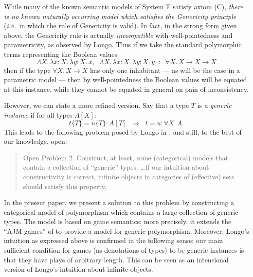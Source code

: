 \documentclass[a4paper,11pt]{article}
\newcommand{\ie}{\textit{i.e.}\ }
\begin{document}
While many of the known semantic models of System F satisfy axiom (C),
\emph{there is no known naturally occurring model which satisfies the
  Genericity principle} (\ie in which the  rule of
  Genericity is valid). In fact, in the strong form given above, the
  Genericity rule is actually \emph{incompatible} with
  well-pointedness and parametricity, as observed by Longo. Thus if we
  take the standard polymorphic terms representing the Boolean values
\[ \Lambda X.\, \lambda x{:}X.\, \lambda y{:}X.\, x , \;\; \Lambda X. \, \lambda
x{:}X. \, \lambda y{:}X.\, y \;\; : \;\; \forall X. \, X \rightarrow X \rightarrow X \]
then if the type $\forall X. \, X \rightarrow X$ has only one
inhabitant --- as will be the case in a parametric model --- then by
well-pointedness the Boolean values will be equated at this instance,
while they cannot be equated in general on pain of inconsistency.

However, we can state a more refined version. Say that a type $T$ is
\emph{a generic instance} if for all types $A[X]$:
\[ t\{ T\} = u\{T\} : A[T] \;\; \Longrightarrow \;\; t = u : \forall X. \, A
. \]
This leads to the following problem posed by Longo in  \cite{Lon95}, and
still, to the best of our knowledge, open:
\begin{quotation}
Open Problem 2. Construct, at least, some (categorical) models that
contain a collection of ``generic'' types. \ldots If our intuition
about constructivity is correct, infinite objects in categories of
(effective) sets should satisfy this property.
\end{quotation}

In the present paper, we present a solution to this problem by
constructing a categorical model of polymorphism which contains a
large collection of generic types. The model is based on game
semantics; more precisely, it extends the ``AJM games'' of \cite{AJM00} to
provide a model for generic polymorphism. Moreover, Longo's intuition
as expressed above is confirmed in the following sense: our main
sufficient condition for games (as denotations of types) to be generic
instances is that they have plays of arbitrary length. This can be
seen as an intensional version of Longo's intuition about infinite
objects.
\end{document}
